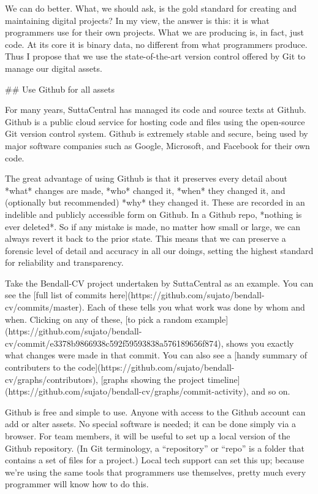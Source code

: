 \documentclass[11pt, openany,a5paper]{article}
\begin{document}
\begin{markdown}
We can do better. What, we should ask, is the gold standard for creating and maintaining digital projects? In my view, the answer is this: it is what programmers use for their own projects. What we are producing is, in fact, just code. At its core it is binary data, no different from what programmers produce. Thus I propose that we use the state-of-the-art version control offered by Git to manage our digital assets.

## Use Github for all assets

For many years, SuttaCentral has managed its code and source texts at Github. Github is a public cloud service for hosting code and files using the open-source Git version control system. Github is extremely stable and secure, being used by major software companies such as Google, Microsoft, and Facebook for their own code.

The great advantage of using Github is that it preserves every detail about *what* changes are made, *who* changed it, *when* they changed it, and (optionally but recommended) *why* they changed it. These are recorded in an indelible and publicly accessible form on Github. In a Github repo, *nothing is ever deleted*. So if any mistake is made, no matter how small or large, we can always revert it back to the prior state. This means that we can preserve a forensic level of detail and accuracy in all our doings, setting the highest standard for reliability and transparency.

Take the Bendall-CV project undertaken by SuttaCentral as an example. You can see the [full list of commits here](https://github.com/sujato/bendall-cv/commits/master). Each of these tells you what work was done by whom and when. Clicking on any of these, [to pick a random example](https://github.com/sujato/bendall-cv/commit/e3378b9866938c592f59593838a576189656f874), shows you exactly what changes were made in that commit. You can also see a [handy summary of contributers to the code](https://github.com/sujato/bendall-cv/graphs/contributors), [graphs showing the project timeline](https://github.com/sujato/bendall-cv/graphs/commit-activity), and so on.

Github is free and simple to use. Anyone with access to the Github account can add or alter assets. No special software is needed; it can be done simply via a browser. For team members, it will be useful to set up a local version of the Github repository. (In Git terminology, a “repository” or “repo” is a folder that contains a set of files for a project.) Local tech support can set this up; because we’re using the same tools that programmers use themselves, pretty much every programmer will know how to do this.


\end{markdown}
\end{document}
